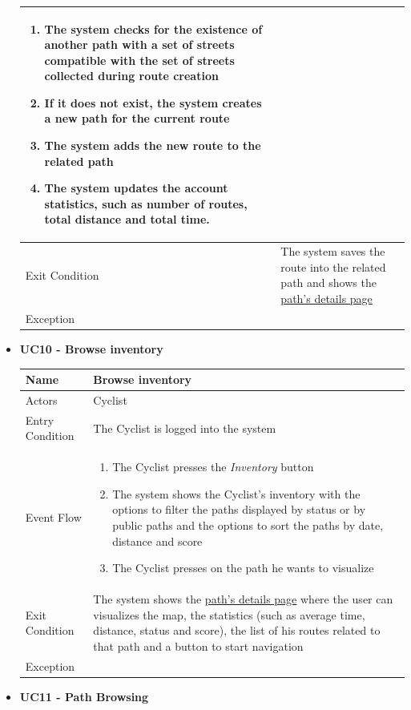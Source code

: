 \begin{itemize}
\begin{tabular}{|p{7cm}|p{7cm}|}
\begin{enumerate}
    \item The system checks for the existence of another path with a set of streets compatible with the set of streets collected during route creation 
    \item If it does not exist, the system creates a new path for the current route
    \item The system adds the new route to the related path
    \item The system updates the account statistics, such as number of routes, total distance and total time.
\end{enumerate}
\\ \hline
Exit Condition  & The system saves the route into the related path and shows the  \hyperref[fig:Inventory]{path's details page} \\ \hline
Exception       &
\\ \hline
\end{tabular}
\newpage
\item \textbf{UC10 - Browse inventory}\par\smallskip
\noindent
\begin{tabular}{|p{7cm}|p{7cm}|}
\hline
Name            & Browse inventory \\ \hline
Actors          & Cyclist \\ \hline
Entry Condition & The Cyclist is logged into the system  \\ \hline
Event Flow      &
\begin{enumerate}
    \item The Cyclist presses the \textit{Inventory} button
    \item The system shows the Cyclist's inventory with the options to filter the paths displayed by status or by public paths and the options to sort the paths by date, distance and score
    \item The Cyclist presses on the path he wants to visualize
\end{enumerate}
\\ \hline
Exit Condition  & The system shows the \hyperref[fig:Inventory]{ path's details page} where the user can visualizes the map, the statistics (such as average time, distance, status and score), the list of his routes related to that path and a button to start navigation \\ \hline
Exception       &
\\ \hline
\end{tabular}
\bigskip
\item \textbf{UC11 - Path Browsing}\par\smallskip

\end{itemize}
